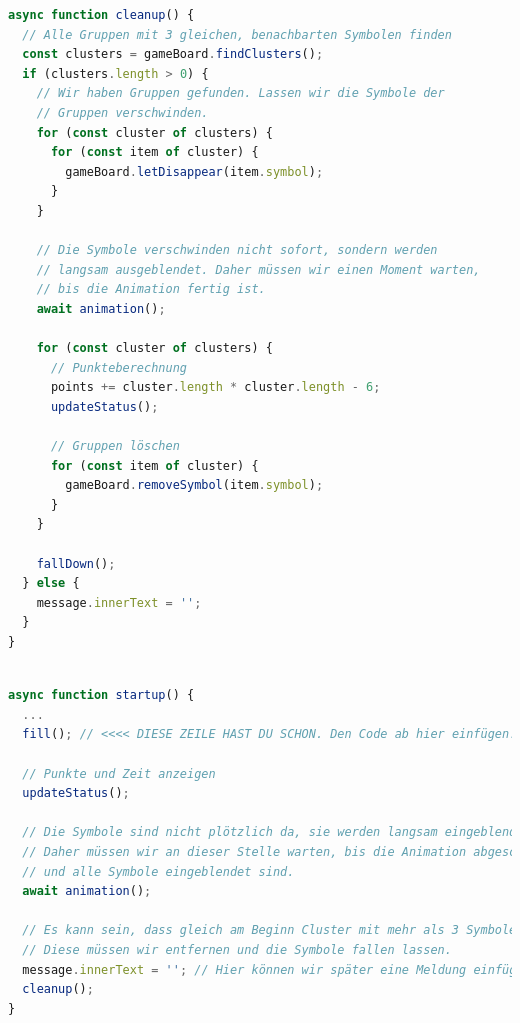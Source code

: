 \documentclass{article}
\begin{document}
    \begin{lstlisting}[language=JavaScript]
async function cleanup() {
  // Alle Gruppen mit 3 gleichen, benachbarten Symbolen finden
  const clusters = gameBoard.findClusters();
  if (clusters.length > 0) {
    // Wir haben Gruppen gefunden. Lassen wir die Symbole der
    // Gruppen verschwinden.
    for (const cluster of clusters) {
      for (const item of cluster) {
        gameBoard.letDisappear(item.symbol);
      }
    }

    // Die Symbole verschwinden nicht sofort, sondern werden
    // langsam ausgeblendet. Daher müssen wir einen Moment warten,
    // bis die Animation fertig ist.
    await animation();

    for (const cluster of clusters) {
      // Punkteberechnung
      points += cluster.length * cluster.length - 6;
      updateStatus();

      // Gruppen löschen
      for (const item of cluster) {
        gameBoard.removeSymbol(item.symbol);
      }
    }

    fallDown();
  } else {
    message.innerText = '';
  }
}
    \end{lstlisting}
    
    \vspace{0.5cm}


    \newpage


    \begin{lstlisting}[language=JavaScript]

async function startup() {
  ...
  fill(); // <<<< DIESE ZEILE HAST DU SCHON. Den Code ab hier einfügen!

  // Punkte und Zeit anzeigen
  updateStatus();

  // Die Symbole sind nicht plötzlich da, sie werden langsam eingeblendet.
  // Daher müssen wir an dieser Stelle warten, bis die Animation abgeschlossen ist
  // und alle Symbole eingeblendet sind.
  await animation();

  // Es kann sein, dass gleich am Beginn Cluster mit mehr als 3 Symbolen entstanden.
  // Diese müssen wir entfernen und die Symbole fallen lassen.
  message.innerText = ''; // Hier können wir später eine Meldung einfügen
  cleanup();
}

    \end{lstlisting}
\end{document}
